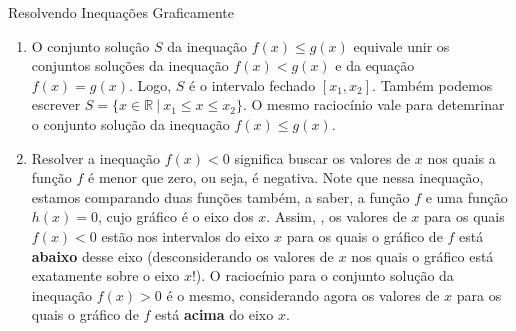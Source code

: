\begin{observationtitle}{Resolvendo Inequações Graficamente}
\begin{enumerate}
\item{}
O conjunto solução $S$ da inequação $f(x) \leq g(x)$ equivale unir os conjuntos soluções da inequação $f(x) < g(x)$ e da equação $f(x) = g(x)$. Logo, $S$ é o intervalo fechado $[x_1, x_2]$. Também podemos escrever $S = \{x \in \mathbb{R}\ | \ x_1 \leq x \leq x_2\}$. O mesmo raciocínio vale para detemrinar o conjunto solução da inequação $f(x) \leq g(x)$.

\item{}
Resolver a inequação $f(x) < 0$ significa buscar os valores de $x$ nos quais a função $f$ é menor que zero, ou seja, é negativa. Note que nessa inequação, estamos comparando duas funções também, a saber, a função $f$ e uma função $h(x)=0$, cujo gráfico é o eixo dos $x$. Assim, , os valores de $x$ para os quais $f(x) <0$ estão nos intervalos do eixo $x$ para os quais o gráfico de $f$ está \textbf{abaixo} desse eixo (desconsiderando os valores de $x$ nos quais o gráfico está exatamente sobre o eixo $x$!). O raciocínio para o conjunto solução da inequação $f(x) >0$ é o mesmo, considerando agora os valores de $x$ para os quais o gráfico de $f$ está \textbf{acima} do eixo $x$.
\end{enumerate}

\end{observationtitle}


\label{\detokenize{AF107-6:inequacoes}}\label{\detokenize{AF107-6::doc}}


